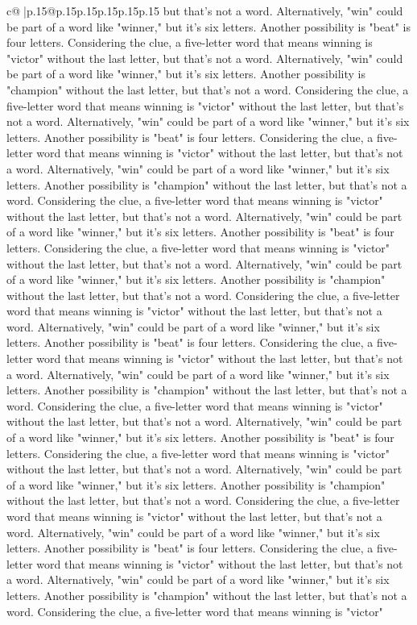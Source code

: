 \documentclass{article}
\begin{document}
{\begin{supertabular}{c@{$\;$}|p{.15\linewidth}@{}p{.15\linewidth}p{.15\linewidth}p{.15\linewidth}p{.15\linewidth}p{.15\linewidth}}
{{{but that's not a word. Alternatively, "win" could be part of a word like "winner," but it's six letters. Another possibility is "beat" is four letters. Considering the clue, a five{-}letter word that means winning is "victor" without the last letter, but that's not a word. Alternatively, "win" could be part of a word like "winner," but it's six letters. Another possibility is "champion" without the last letter, but that's not a word. Considering the clue, a five{-}letter word that means winning is "victor" without the last letter, but that's not a word. Alternatively, "win" could be part of a word like "winner," but it's six letters. Another possibility is "beat" is four letters. Considering the clue, a five{-}letter word that means winning is "victor" without the last letter, but that's not a word. Alternatively, "win" could be part of a word like "winner," but it's six letters. Another possibility is "champion" without the last letter, but that's not a word. Considering the clue, a five{-}letter word that means winning is "victor" without the last letter, but that's not a word. Alternatively, "win" could be part of a word like "winner," but it's six letters. Another possibility is "beat" is four letters. Considering the clue, a five{-}letter word that means winning is "victor" without the last letter, but that's not a word. Alternatively, "win" could be part of a word like "winner," but it's six letters. Another possibility is "champion" without the last letter, but that's not a word. Considering the clue, a five{-}letter word that means winning is "victor" without the last letter, but that's not a word. Alternatively, "win" could be part of a word like "winner," but it's six letters. Another possibility is "beat" is four letters. Considering the clue, a five{-}letter word that means winning is "victor" without the last letter, but that's not a word. Alternatively, "win" could be part of a word like "winner," but it's six letters. Another possibility is "champion" without the last letter, but that's not a word. Considering the clue, a five{-}letter word that means winning is "victor" without the last letter, but that's not a word. Alternatively, "win" could be part of a word like "winner," but it's six letters. Another possibility is "beat" is four letters. Considering the clue, a five{-}letter word that means winning is "victor" without the last letter, but that's not a word. Alternatively, "win" could be part of a word like "winner," but it's six letters. Another possibility is "champion" without the last letter, but that's not a word. Considering the clue, a five{-}letter word that means winning is "victor" without the last letter, but that's not a word. Alternatively, "win" could be part of a word like "winner," but it's six letters. Another possibility is "beat" is four letters. Considering the clue, a five{-}letter word that means winning is "victor" without the last letter, but that's not a word. Alternatively, "win" could be part of a word like "winner," but it's six letters. Another possibility is "champion" without the last letter, but that's not a word. Considering the clue, a five{-}letter word that means winning is "victor" }}}
\end{supertabular}}
\end{document}
